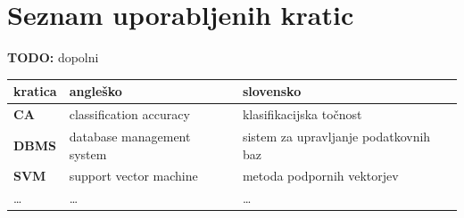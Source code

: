 \documentclass[a4paper, 12pt]{book}
\newcommand{\clearemptydoublepage}{\newpage{\pagestyle{empty}\cleardoublepage}}
\begin{document}
\clearemptydoublepage


\pagestyle{empty}
\def\thepage{}%
\tableofcontents{}


\clearemptydoublepage


\chapter*{Seznam uporabljenih kratic}  %
\textbf{TODO:} dopolni

\noindent\begin{tabular}{p{}|p{}|p{}}    %
  {\bf kratica} & {\bf angleško}                             & {\bf slovensko} \\ \hline
  {\bf CA}      & classification accuracy               & klasifikacijska točnost \\
  {\bf DBMS} & database management system & sistem za upravljanje podatkovnih baz \\
  {\bf SVM}   & support vector machine              & metoda podpornih vektorjev \\
  \dots & \dots & \dots \\
\end{tabular}


\clearemptydoublepage

\end{document}
